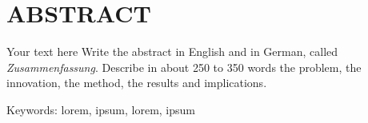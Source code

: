 \documentclass[../projects/thesis.tex]{subfiles}
\begin{document}
\chapter*{ABSTRACT}

Your text here Write the abstract in English and in German, called \emph{Zusammenfassung}.
Describe in about 250 to 350 words the problem, the innovation, the method, the results and implications.

\vspace{\baselineskip}
\noindent Keywords: lorem, ipsum, lorem, ipsum


\end{document}
